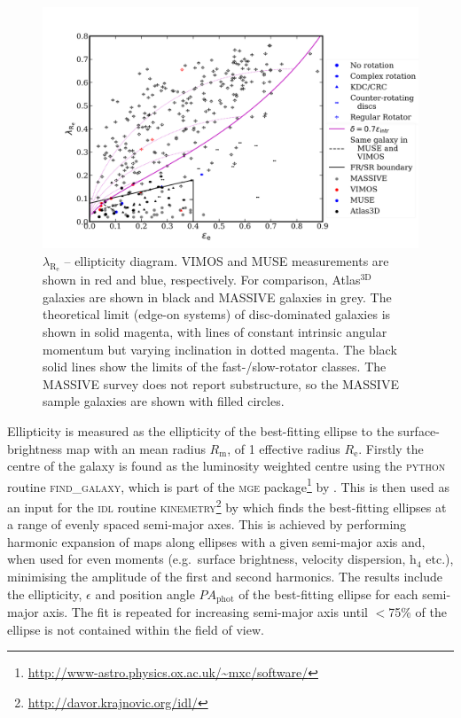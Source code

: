 			\begin{figure}
				\centering
				\includegraphics[width=.9\textwidth]{chapter4/lambda_R_ellipticity.png}
				\caption[$\lambda_\mathrm{R_e}$ -- ellipticity diagram]{$\lambda_\mathrm{R_e}$ -- ellipticity diagram. VIMOS and MUSE measurements are shown in red and blue, respectively. For comparison, Atlas$^\text{3D}$ galaxies \citep{Emsellem2011} are shown in black and MASSIVE galaxies \citep{Veale2017} in grey. The theoretical limit (edge-on systems) of disc-dominated galaxies is shown in solid magenta, with lines of constant intrinsic angular momentum but varying inclination in dotted magenta. The black solid lines show the limits of the fast-/slow-rotator classes. The MASSIVE survey does not report substructure, so the MASSIVE sample galaxies are shown with filled circles.}
				\label{fig:lambdaR_ellip}
			\end{figure}

			Ellipticity is measured as the ellipticity of the best-fitting ellipse to the surface-brightness map with an mean radius $R_\mathrm{m}$, of 1 effective radius $R_\mathrm{e}$. Firstly the centre of the galaxy is found as the luminosity weighted centre using the \textsc{python} routine \textsc{find\_galaxy}, which is part of the \textsc{mge} package\footnote{\url{http://www-astro.physics.ox.ac.uk/\~mxc/software/}} by \citet{Cappellari2002}. This is then used as an input for the \textsc{idl} routine \textsc{kinemetry}\footnote{\url{http://davor.krajnovic.org/idl/}} by \citet{Krajnovic2006} which finds the best-fitting ellipses at a range of evenly spaced semi-major axes. This is achieved by performing harmonic expansion of maps along ellipses with a given semi-major axis and, when used for even moments (e.g.\ surface brightness, velocity dispersion, h$_4$ etc.), minimising the amplitude of the first and second harmonics. The results include the ellipticity, $\epsilon$ and position angle $PA_\text{phot}$ of the best-fitting ellipse for each semi-major axis. The fit is repeated for increasing semi-major axis until $<$75\% of the ellipse is not contained within the field of view.

